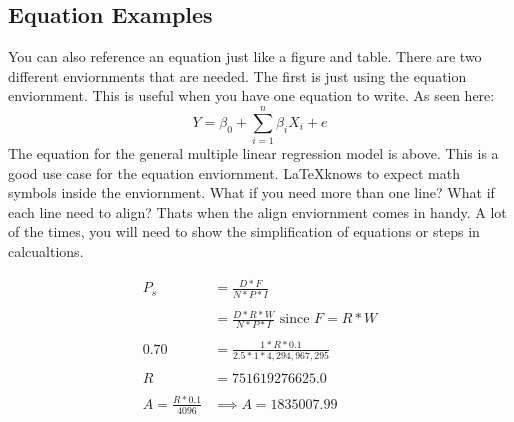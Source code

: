 \documentclass[./dissertation.tex]{subfiles}
\begin{document}
      \subsection{Equation Examples}
        You can also reference an equation just like a figure and table. There are two different enviornments that are needed. The first is just using the equation enviornment. This is useful when you have one equation to write. As seen here:
          \begin{equation*}
            Y=\beta_{0} + \sum\limits_{i=1}^n \beta_{i}X_{i} + e
          \end{equation*}
        The equation for the general multiple linear regression model is above. This is a good use case for the equation enviornment. \LaTeX  knows to expect math symbols inside the enviornment. What if you need more than one line? What if each line need to align? Thats when the align enviornment comes in handy. A lot of the times, you will need to show the simplification of equations or steps in calcualtions.
          \begin{center}
            \begin{align*}
              P_{s} &= \frac{D*F}{N*P*I}\\
                            \\
              &= \frac{D*R*W}{N*P*I} \text{  since } F=R*W\\
                      \\
              0.70 &= \frac{1*R*0.1}{2.5*1*4,294,967,295}\\
                      \\
             R &= 751619276625.0 \\
             \\
             A=\frac{R*0.1}{4096} &\implies A = 1835007.99
           \end{align*}
         \end{center}
\end{document}
